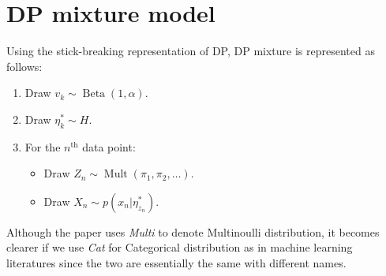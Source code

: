 \documentclass[11pt]{article}
\newcommand{\opn}{\operatorname}
\begin{document}
\section{DP mixture model}
Using the stick-breaking representation of DP, DP mixture is represented as follows:
\begin{enumerate}
  \item Draw $v_{k} \sim \opn{Beta}\left(1, \alpha \right)$.
  \item Draw $\eta_{k}^{*} \sim H$.
  \item For the $n^{\text{th}}$ data point:
    \begin{itemize}
      \item Draw $Z_{n} \sim \opn{Mult}\left(\pi_{1}, \pi_{2}, \ldots \right)$.
      \item Draw $X_{n} \sim p\left(x_{n}|\eta_{z_{n}}^{*} \right) $.
    \end{itemize}
\end{enumerate}
Although the paper uses \emph{Multi} to denote Multinoulli distribution, it becomes clearer if we use \emph{Cat} for Categorical distribution as in machine learning literatures since the two are essentially the same with different names.
\end{document}
